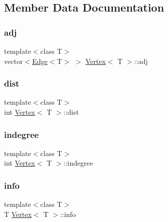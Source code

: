 \subsection{Member Data Documentation}
\mbox{\label{class_vertex_a5d9dfdd2caee11e300ff5142799345a1}} 
\subsubsection{\texorpdfstring{adj}{adj}}
{\footnotesize\ttfamily template$<$class T$>$ \\
vector$<$\hyperlink{class_edge}{Edge}$<$T$>$ $>$ \hyperlink{class_vertex}{Vertex}$<$ T $>$\+::adj\hspace{0.3cm}{\ttfamily [private]}}

\mbox{\label{class_vertex_ab2e06daa1acc81f7bd75f3d45c73a49a}} 
\subsubsection{\texorpdfstring{dist}{dist}}
{\footnotesize\ttfamily template$<$class T$>$ \\
int \hyperlink{class_vertex}{Vertex}$<$ T $>$\+::dist\hspace{0.3cm}{\ttfamily [private]}}

\mbox{\label{class_vertex_ab29ac1b694fc673ba26cfc6d3e9bda13}} 
\subsubsection{\texorpdfstring{indegree}{indegree}}
{\footnotesize\ttfamily template$<$class T$>$ \\
int \hyperlink{class_vertex}{Vertex}$<$ T $>$\+::indegree\hspace{0.3cm}{\ttfamily [private]}}

\mbox{\label{class_vertex_a415d7811eef6cdd992f0dca1f35a49cd}} 
\subsubsection{\texorpdfstring{info}{info}}
{\footnotesize\ttfamily template$<$class T$>$ \\
T \hyperlink{class_vertex}{Vertex}$<$ T $>$\+::info\hspace{0.3cm}{\ttfamily [private]}}

